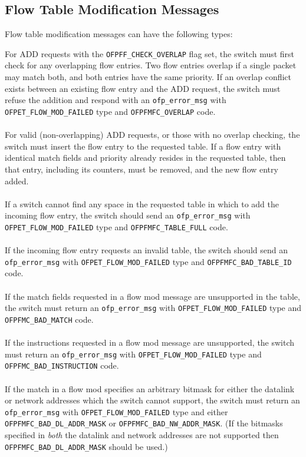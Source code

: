 \documentclass[10pt]{article}
\begin{document}
\subsection{Flow Table Modification Messages}
\label{sec:flow mod messages}
\label{flow_table:sec_chan:flow_add}
\label{flow_table:sec_chan:flow_mod}
\label{flow_table:sec_chan:flow_removal}
Flow table modification messages can have the following types:

For ADD requests with the \verb|OFPFF_CHECK_OVERLAP| flag set, the switch must first check for any overlapping flow entries.  Two flow entries overlap if a single packet may match both, and both entries have the same priority.  If an overlap conflict exists between an existing flow entry and the ADD request, the switch must refuse the addition and respond with an \verb|ofp_error_msg| with \verb|OFPET_FLOW_MOD_FAILED| type and \verb|OFPFMFC_OVERLAP| code.
\\\\
For valid (non-overlapping) ADD requests, or those with no overlap checking, the switch must insert the flow entry to the requested table.  If a flow entry with identical match fields and priority already resides in the requested table, then that entry, including its counters, must be removed, and the new flow entry added.
\\\\
If a switch cannot find any space in the requested table in which to add the incoming flow entry, the switch should send an \verb|ofp_error_msg| with \verb|OFPET_FLOW_MOD_FAILED| type and \verb|OFPFMFC_TABLE_FULL| code.
\\\\
If the incoming flow entry requests an invalid table, the switch should send an \verb|ofp_error_msg| with \verb|OFPET_FLOW_MOD_FAILED| type and \verb|OFPFMFC_BAD_TABLE_ID| code.
\\\\
If the match fields requested in a flow mod message are unsupported in the table, the switch must return an \verb|ofp_error_msg| with \verb|OFPET_FLOW_MOD_FAILED| type and \verb|OFPFMC_BAD_MATCH| code.
\\\\
If the instructions requested in a flow mod message are unsupported, the switch must return an \verb|ofp_error_msg| with \verb|OFPET_FLOW_MOD_FAILED| type and \verb|OFPFMC_BAD_INSTRUCTION| code.
\\\\
If the match in a flow mod specifies an arbitrary bitmask for either the datalink or network addresses which the switch cannot support, the switch must return an \verb|ofp_error_msg| with \verb|OFPET_FLOW_MOD_FAILED| type and either \verb|OFPFMFC_BAD_DL_ADDR_MASK| or \verb|OFPFMFC_BAD_NW_ADDR_MASK|. (If the bitmasks specified in \emph{both} the datalink and network addresses are not supported then \verb|OFPFMFC_BAD_DL_ADDR_MASK| should be used.)
\end{document}
